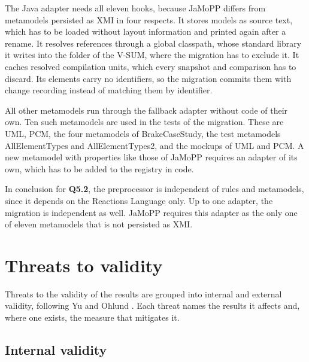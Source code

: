 The Java adapter needs all eleven hooks, because JaMoPP differs from metamodels persisted as XMI in four respects.
It stores models as source text, which has to be loaded without layout information and printed again after a rename.
It resolves references through a global classpath, whose standard library it writes into the folder of the V-SUM, where the migration has to exclude it.
It caches resolved compilation units, which every snapshot and comparison has to discard.
Its elements carry no identifiers, so the migration commits them with change recording instead of matching them by identifier.

All other metamodels run through the fallback adapter without code of their own.
Ten such metamodels are used in the tests of the migration.
These are UML, PCM, the four metamodels of BrakeCaseStudy, the test metamodels AllElementTypes and AllElementTypes2, and the mockups of UML and PCM.
A new metamodel with properties like those of JaMoPP requires an adapter of its own, which has to be added to the registry in code.

In conclusion for \textbf{Q5.2}, the preprocessor is independent of rules and metamodels, since it depends on the Reactions Language only.
Up to one adapter, the migration is independent as well.
JaMoPP requires this adapter as the only one of eleven metamodels that is not persisted as XMI.

\section{Threats to validity}
\label{sec:Evaluation:ThreatsToValidity}

Threats to the validity of the results are grouped into internal and external validity, following Yu and Ohlund \cite{yu2010threats}.
Each threat names the results it affects and, where one exists, the measure that mitigates it.

\subsection{Internal validity}
\label{sec:Evaluation:ThreatsToValidity:InternalValidity}

